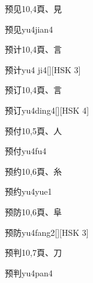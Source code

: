 \begin{entry}{预见}{10,4}{⾴、⾒}
  \begin{phonetics}{预见}{yu4jian4}
  \end{phonetics}
\end{entry}

\begin{entry}{预计}{10,4}{⾴、⾔}
  \begin{phonetics}{预计}{yu4 ji4}[][HSK 3]
  \end{phonetics}
\end{entry}

\begin{entry}{预订}{10,4}{⾴、⾔}
  \begin{phonetics}{预订}{yu4ding4}[][HSK 4]
  \end{phonetics}
\end{entry}

\begin{entry}{预付}{10,5}{⾴、⼈}
  \begin{phonetics}{预付}{yu4fu4}
  \end{phonetics}
\end{entry}

\begin{entry}{预约}{10,6}{⾴、⽷}
  \begin{phonetics}{预约}{yu4yue1}
  \end{phonetics}
\end{entry}

\begin{entry}{预防}{10,6}{⾴、⾩}
  \begin{phonetics}{预防}{yu4fang2}[][HSK 3]
  \end{phonetics}
\end{entry}

\begin{entry}{预判}{10,7}{⾴、⼑}
  \begin{phonetics}{预判}{yu4pan4}
  \end{phonetics}
\end{entry}

